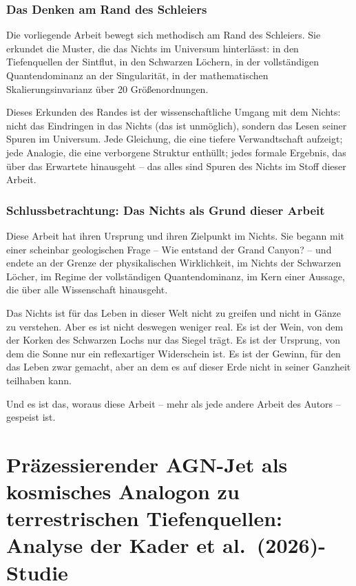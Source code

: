 ﻿\documentclass[12pt,a4paper]{report}
\begin{document}
\subsection{Das Denken am Rand des Schleiers}

Die vorliegende Arbeit bewegt sich methodisch am Rand des Schleiers. Sie erkundet die Muster, die das Nichts im Universum hinterlässt: in den Tiefenquellen der Sintflut, in den Schwarzen Löchern, in der vollständigen Quantendominanz an der Singularität, in der mathematischen Skalierungsinvarianz über 20 Größenordnungen.

Dieses Erkunden des Randes ist der wissenschaftliche Umgang mit dem Nichts: nicht das Eindringen in das Nichts (das ist unmöglich), sondern das Lesen seiner Spuren im Universum. Jede Gleichung, die eine tiefere Verwandtschaft aufzeigt; jede Analogie, die eine verborgene Struktur enthüllt; jedes formale Ergebnis, das über das Erwartete hinausgeht -- das alles sind Spuren des Nichts im Stoff dieser Arbeit.

\subsection{Schlussbetrachtung: Das Nichts als Grund dieser Arbeit}

Diese Arbeit hat ihren Ursprung und ihren Zielpunkt im Nichts. Sie begann mit einer scheinbar geologischen Frage -- Wie entstand der Grand Canyon? -- und endete an der Grenze der physikalischen Wirklichkeit, im Nichts der Schwarzen Löcher, im Regime der vollständigen Quantendominanz, im Kern einer Aussage, die über alle Wissenschaft hinausgeht.

Das Nichts ist für das Leben in dieser Welt nicht zu greifen und nicht in Gänze zu verstehen. Aber es ist nicht deswegen weniger real. Es ist der Wein, von dem der Korken des Schwarzen Lochs nur das Siegel trägt. Es ist der Ursprung, von dem die Sonne nur ein reflexartiger Widerschein ist. Es ist der Gewinn, für den das Leben zwar gemacht, aber an dem es auf dieser Erde nicht in seiner Ganzheit teilhaben kann.

Und es ist das, woraus diese Arbeit -- mehr als jede andere Arbeit des Autors -- gespeist ist.



\chapter{Präzessierender AGN-Jet als kosmisches Analogon zu terrestrischen Tiefenquellen: Analyse der Kader et al.\ (2026)-Studie}
\label{chap:agn_jet}
\end{document}
